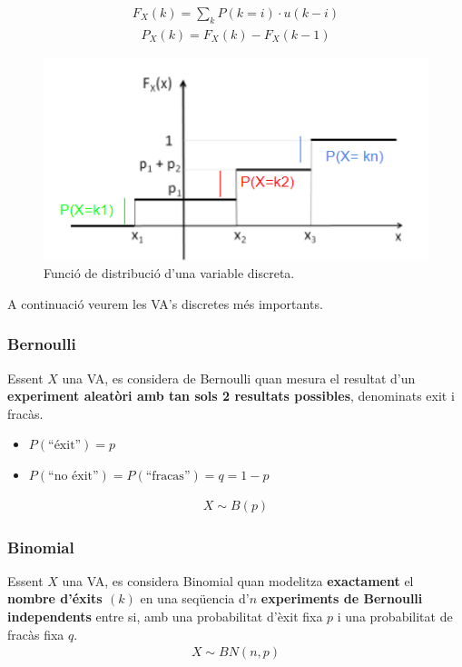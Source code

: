\documentclass{article}
\begin{document}
\begin{align*}
F_X(k) = \displaystyle \sum_{k} P(k=i) \cdot u(k-i)
\end{align*}
\begin{align*}
P_X(k) = F_X(k) - F_X(k-1)
\end{align*}
\begin{figure}[H]
    \includegraphics[scale=0.7]{pictures/image7.png}
    \centering
    \caption{Funció de distribució d’una variable discreta.}
    \label{fig:fda}
\end{figure}

A continuació veurem les VA's discretes més importants.

\subsubsection{Bernoulli}
Essent $X$ una VA, es considera de Bernoulli quan mesura el resultat d'un \textbf{experiment aleatòri amb tan sols 2 resultats possibles}, denominats exit i fracàs. 
\begin{itemize}
    \item $P(\textrm{``éxit''}) = p$
    \item $P(\textrm{``no éxit''}) = P(\textrm{``fracas''}) = q = 1-p$ 
\end{itemize}
\begin{align*}
    X \sim B(p)
\end{align*}

\subsubsection{Binomial}
Essent $X$ una VA, es considera Binomial quan modelitza \textbf{exactament} el \textbf{nombre d'éxits $(k)$} en una seqüencia d'$n$ \textbf{experiments de Bernoulli independents} entre si, amb una probabilitat d'èxit fixa $p$ i una probabilitat de fracàs fixa $q$. 
\begin{align*}
    X \sim BN(n,p)
\end{align*}
\end{document}
